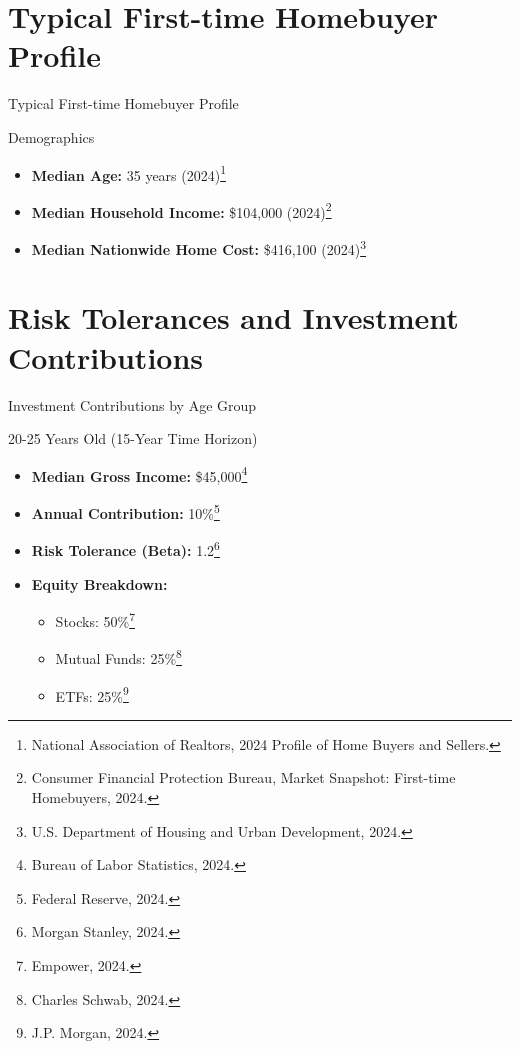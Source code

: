\documentclass{beamer}
\begin{document}
\section{Typical First-time Homebuyer Profile}
\begin{frame}{Typical First-time Homebuyer Profile}
    \begin{block}{Demographics}
        \begin{itemize}
            \item \textbf{Median Age:} 35 years (2024)\footnote{National Association of Realtors, 2024 Profile of Home Buyers and Sellers.}
            \item \textbf{Median Household Income:} \$104,000 (2024)\footnote{Consumer Financial Protection Bureau, Market Snapshot: First-time Homebuyers, 2024.}
            \item \textbf{Median Nationwide Home Cost:} \$416,100 (2024)\footnote{U.S. Department of Housing and Urban Development, 2024.}
        \end{itemize}
    \end{block}
\end{frame}

\section{Risk Tolerances and Investment Contributions}
\begin{frame}{Investment Contributions by Age Group}
    \begin{block}{20-25 Years Old (15-Year Time Horizon)}
        \begin{itemize}
            \item \textbf{Median Gross Income:} \$45,000\footnote{Bureau of Labor Statistics, 2024.}
            \item \textbf{Annual Contribution:} 10\%\footnote{Federal Reserve, 2024.}
            \item \textbf{Risk Tolerance (Beta):} 1.2\footnote{Morgan Stanley, 2024.}
            \item \textbf{Equity Breakdown:}
            \begin{itemize}
                \item Stocks: 50\%\footnote{Empower, 2024.}
                \item Mutual Funds: 25\%\footnote{Charles Schwab, 2024.}
                \item ETFs: 25\%\footnote{J.P. Morgan, 2024.}
            \end{itemize}
        \end{itemize}
    \end{block}
\end{frame}
\end{document}
